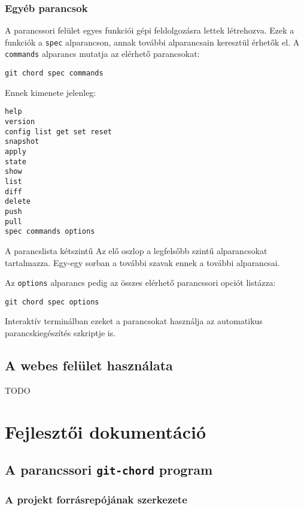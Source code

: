 \documentclass[final]{elteikthesis}[2025/03/25]
\begin{document}
\subsection{Egyéb parancsok}

A parancssori felület egyes funkciói gépi feldolgozásra lettek létrehozva.
Ezek a funkciók a \verb|spec| alparancson, annak további alparancsain keresztül érhetők el.
A \verb|commands| alparancs mutatja az elérhető parancsokat:

\begin{verbatim}
git chord spec commands
\end{verbatim}

Ennek kimenete jelenleg:

\begin{verbatim}
help
version
config list get set reset
snapshot
apply
state
show
list
diff
delete
push
pull
spec commands options
\end{verbatim}

A parancslista kétszintű
Az elő oszlop a legfelsőbb szintű alparancsokat tartalmazza.
Egy-egy sorban a további szavak ennek a további alparancsai.

Az \verb|options| alparancs pedig az összes elérhető parancssori opciót listázza:

\begin{verbatim}
git chord spec options
\end{verbatim}

Interaktív terminálban ezeket a parancsokat használja az automatikus parancskiegészítés szkriptje is.

\section{A webes felület használata}

TODO

\cleardoublepage

\chapter{Fejlesztői dokumentáció}

\section{A parancssori \texttt{git-chord} program}

\subsection{A projekt forrásrepójának szerkezete}
\end{document}
